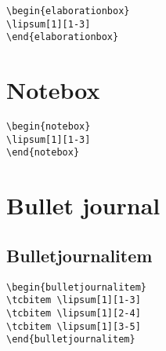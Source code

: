\lipsum[1][1-3]
\begin{highlightbox}
\begin{verbatim}
\begin{elaborationbox}
\lipsum[1][1-3]
\end{elaborationbox}
\end{verbatim}
\end{highlightbox}
\begin{elaborationbox}
\lipsum[1][1-3]
\end{elaborationbox}


\section{Notebox}
\begin{highlightbox}
\begin{verbatim}
\begin{notebox}
\lipsum[1][1-3]
\end{notebox}
\end{verbatim}
\end{highlightbox}
\begin{notebox}
\lipsum[1][1-3]
\end{notebox}

\section{Bullet journal }

\subsection{Bulletjournalitem}

\lipsum[1][1-3]
\begin{highlightbox}
\begin{verbatim}
\begin{bulletjournalitem}
\tcbitem \lipsum[1][1-3]
\tcbitem \lipsum[1][2-4]
\tcbitem \lipsum[1][3-5]
\end{bulletjournalitem}
\end{verbatim}
\end{highlightbox}
\begin{bulletjournalitem}
\tcbitem \lipsum[1][1-3]
\tcbitem \lipsum[1][2-4]
\tcbitem \lipsum[1][3-5]
\end{bulletjournalitem}

